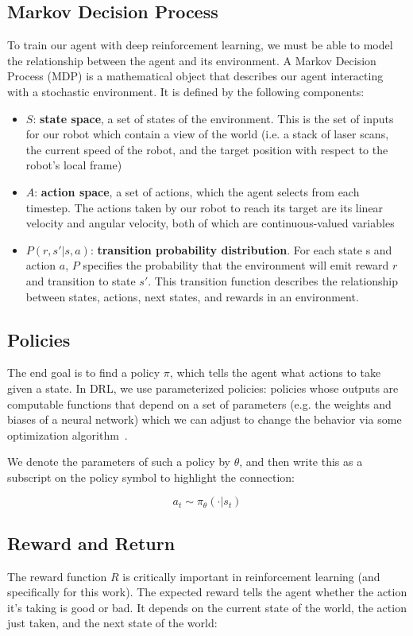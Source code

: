 \subsection{Markov Decision Process}
To train our agent with deep reinforcement learning, we must be able to model the relationship between the agent and its environment. A Markov Decision Process (MDP) is a mathematical object that describes our agent interacting with a stochastic environment. It is defined by the following components:
\begin{itemize}
\item $S$: \textbf{state space}, a set of states of the environment. This is the set of inputs for our robot which contain a view of the world (i.e. a stack of laser scans, the current speed of the robot, and the target position with respect to the robot's local frame)
\item $A$: \textbf{action space}, a set of actions, which the agent selects from each timestep. The actions taken by our robot to reach its target are its linear velocity and angular velocity, both of which are continuous-valued variables
\item $P(r, s' | s, a)$: \textbf{transition probability distribution}. For each state s and action $a$, $P$ specifies the probability that the environment will emit reward $r$ and transition to state $s'$. This transition function describes the relationship between states, actions, next states, and rewards in an environment.
\end{itemize}

\subsection{Policies}
The end goal is to find a policy $\pi$, which tells the agent what actions to take given a state. In DRL, we use parameterized policies: policies whose outputs are computable functions that depend on a set of parameters (e.g. the weights and biases of a neural network) which we can adjust to change the behavior via some optimization algorithm~\cite{SpinningUp2018}.

We denote the parameters of such a policy by $\theta$, and then write this as a subscript on the policy symbol to highlight the connection:

\begin{equation}
a_{t} \sim \pi_{\theta}(\cdot | s_{t})
\end{equation}

\subsection{Reward and Return}
The reward function $R$ is critically important in reinforcement learning (and specifically for this work). The expected reward tells the agent whether the action it's taking is good or bad. It depends on the current state of the world, the action just taken, and the next state of the world:

